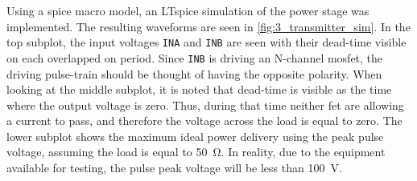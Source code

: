 Using a \gls{spice} macro model, an LTspice simulation of the power stage was implemented. The resulting waveforms are seen in \cref{fig:3_transmitter_sim}. In the top subplot, the input voltages \texttt{INA} and \texttt{INB} are seen with their dead-time visible on each overlapped on period. Since \texttt{INB} is driving an N-channel \gls{mosfet}, the driving pulse-train should be thought of having the opposite polarity. When looking at the middle subplot, it is noted that dead-time is visible as the time where the output voltage is zero. Thus, during that time neither \gls{fet} are allowing a current to pass, and therefore the voltage across the load is equal to zero. The lower subplot shows the maximum ideal power delivery using the peak pulse voltage, assuming the load is equal to \qty{50}{\ohm}. In reality, due to the equipment available for testing, the pulse peak voltage will be less than \qty{100}{\volt}.

